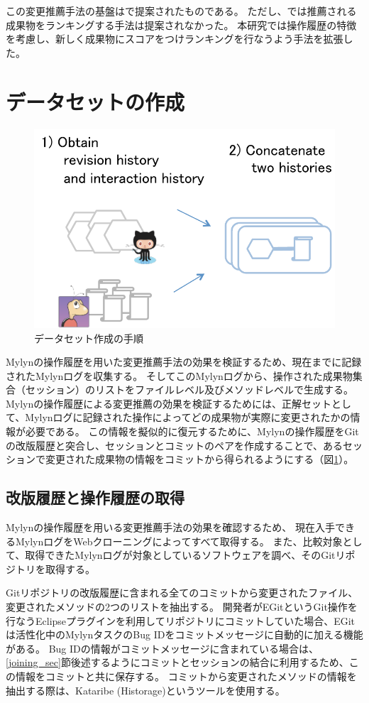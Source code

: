 \documentclass[a4paper]{jsbook}
\begin{document}
この変更推薦手法の基盤は\cite{Zimmermann:2005}で提案されたものである。
ただし、\cite{Zimmermann:2005}では推薦される成果物をランキングする手法は提案されなかった。
本研究では操作履歴の特徴を考慮し、新しく成果物にスコアをつけランキングを行なうよう手法を拡張した。

\section{データセットの作成}\label{data_sec}
\begin{figure}[tb]
  \centering
  \includegraphics[width = 0.7\linewidth]{resource/dataset.pdf}
  \caption{データセット作成の手順}
  \label{dataset}
\end{figure}
Mylynの操作履歴を用いた変更推薦手法の効果を検証するため、現在までに記録されたMylynログを収集する。
そしてこのMylynログから、操作された成果物集合（セッション）のリストをファイルレベル及びメソッドレベルで生成する。
Mylynの操作履歴による変更推薦の効果を検証するためには、正解セットとして、Mylynログに記録された操作によってどの成果物が実際に変更されたかの情報が必要である。
この情報を擬似的に復元するために、Mylynの操作履歴をGitの改版履歴と突合し、セッションとコミットのペアを作成することで、あるセッションで変更された成果物の情報をコミットから得られるようにする（図\ref{dataset}）。
\subsection{改版履歴と操作履歴の取得}\label{obtainhistory_sec}
Mylynの操作履歴を用いる変更推薦手法の効果を確認するため、
現在入手できるMylynログをWebクローニングによってすべて取得する。
また、比較対象として、取得できたMylynログが対象としているソフトウェアを調べ、そのGitリポジトリを取得する。

Gitリポジトリの改版履歴に含まれる全てのコミットから変更されたファイル、変更されたメソッドの2つのリストを抽出する。
開発者がEGitというGit操作を行なうEclipseプラグインを利用してリポジトリにコミットしていた場合、EGitは活性化中のMylynタスクのBug IDをコミットメッセージに自動的に加える機能がある。
Bug IDの情報がコミットメッセージに含まれている場合は、\ref{joining_sec}節後述するようにコミットとセッションの結合に利用するため、この情報をコミットと共に保存する。
コミットから変更されたメソッドの情報を抽出する際は、Kataribe (Historage)\cite{Hata:2011,Fujiwara:2014}というツールを使用する。
\end{document}

